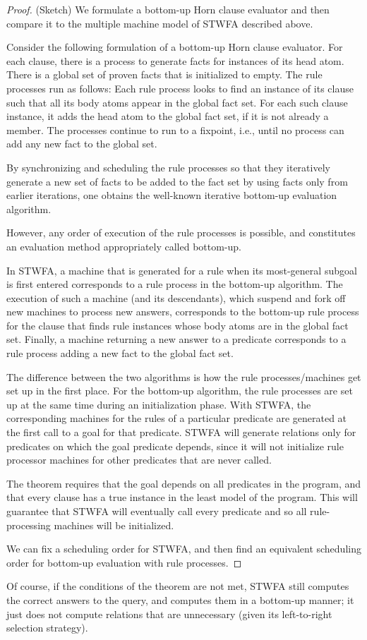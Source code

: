 \begin{proof}
(Sketch) We formulate a bottom-up Horn clause evaluator and then
  compare it to the multiple machine model of STWFA described above.

Consider the following formulation of a bottom-up Horn clause
evaluator.  For each clause, there is a process to generate facts for
instances of its head atom.  There is a global set of proven facts
that is initialized to empty.  The rule processes run as follows: Each
rule process looks to find an instance of its clause such that all its
body atoms appear in the global fact set.  For each such clause
instance, it adds the head atom to the global fact set, if it is not
already a member.  The processes continue to run to a fixpoint, i.e.,
until no process can add any new fact to the global set.

By synchronizing and scheduling the rule processes so that they
iteratively generate a new set of facts to be added to the fact set by
using facts only from earlier iterations, one obtains the well-known
iterative bottom-up evaluation algorithm.

However, any order of execution of the rule processes is possible, and
constitutes an evaluation method appropriately called bottom-up.

In STWFA, a machine that is generated for a rule when its most-general
subgoal is first entered corresponds to a rule process in the
bottom-up algorithm.  The execution of such a machine (and its
descendants), which suspend and fork off new machines to process new
answers, corresponds to the bottom-up rule process for the clause
that finds rule instances whose body atoms are in the global fact set.
Finally, a machine returning a new answer to a predicate corresponds
to a rule process adding a new fact to the global fact set.

The difference between the two algorithms is how the rule
processes/machines get set up in the first place.  For the bottom-up
algorithm, the rule processes are set up at the same time during an
initialization phase.  With STWFA, the corresponding machines for the
rules of a particular predicate are generated at the first call to a
goal for that predicate.  STWFA will generate relations only for
predicates on which the goal predicate depends, since it will not
initialize rule processor machines for other predicates that are never
called.

The theorem requires that the goal depends on all predicates in the
program, and that every clause has a true instance in the least model
of the program.  This will guarantee that STWFA will eventually call
every predicate and so all rule-processing machines will be
initialized.

We can fix a scheduling order for STWFA, and then find an equivalent
scheduling order for bottom-up evaluation with rule processes. 
\end{proof}

Of course, if the conditions of the theorem are not met, STWFA still
computes the correct answers to the query, and computes them in a
bottom-up manner; it just does not compute relations that are
unnecessary (given its left-to-right selection strategy).

